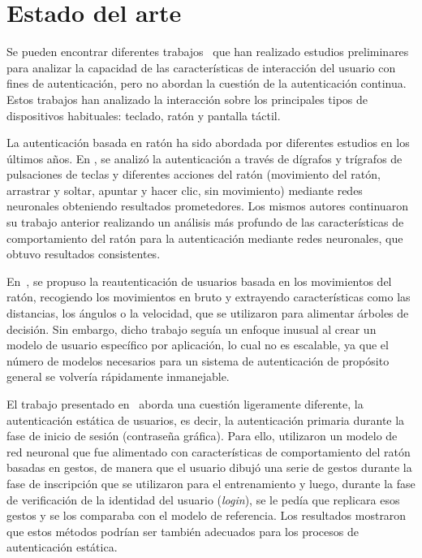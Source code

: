 \chapter{Estado del arte} %
\label{sec:related}

Se pueden encontrar diferentes trabajos~\cite{Barkadehi2018,bhatnagar2013survey} que han realizado estudios preliminares para analizar la capacidad de las características de interacción del usuario con fines de autenticación, pero no abordan la cuestión de la autenticación continua. Estos trabajos han analizado la interacción sobre los principales tipos de dispositivos habituales: teclado, ratón y pantalla táctil. 

La autenticación basada en ratón ha sido abordada por diferentes estudios en los últimos años. En \cite{Ahmed2005DetectingCI}, se analizó la autenticación a través de dígrafos y trígrafos de pulsaciones de teclas y diferentes acciones del ratón (movimiento del ratón, arrastrar y soltar, apuntar y hacer clic, sin movimiento) mediante redes neuronales obteniendo resultados prometedores. Los mismos autores continuaron su trabajo anterior \cite{Ahmed2007} realizando un análisis más profundo de las características de comportamiento del ratón para la autenticación mediante redes neuronales, que obtuvo resultados consistentes.

En~\cite{Pusara2004}, se propuso la reautenticación de usuarios basada en los movimientos del ratón, recogiendo los movimientos en bruto y extrayendo características como las distancias, los ángulos o la velocidad, que se utilizaron para alimentar árboles de decisión. Sin embargo, dicho trabajo seguía un enfoque inusual al crear un modelo de usuario específico por aplicación, lo cual no es escalable, ya que el número de modelos necesarios para un sistema de autenticación de propósito general se volvería rápidamente inmanejable.

El trabajo presentado en~\cite{Sayed2013} aborda una cuestión ligeramente diferente, la autenticación estática de usuarios, es decir, la autenticación primaria durante la fase de inicio de sesión (contraseña gráfica). Para ello, utilizaron un modelo de red neuronal que fue alimentado con características de comportamiento del ratón basadas en gestos, de manera que el usuario dibujó una serie de gestos durante la fase de inscripción que se utilizaron para el entrenamiento y luego, durante la fase de verificación de la identidad del usuario (\textit{login}), se le pedía que replicara esos gestos y se los comparaba con el modelo de referencia. Los resultados mostraron que estos métodos podrían ser también adecuados para los procesos de autenticación estática.

